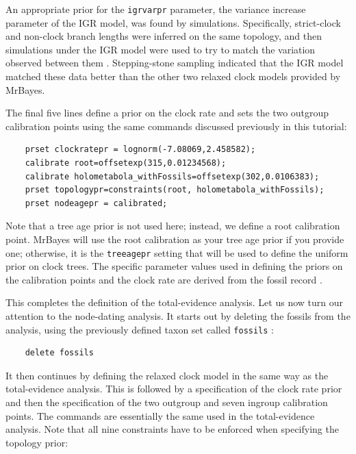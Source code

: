 \documentclass[12pt]{book}
\newcommand{\ttt}[1]{\texttt{#1} }
\begin{document}
An appropriate prior for the \ttt{igrvarpr} parameter, the variance increase parameter of the IGR model, was found
by simulations. Specifically, strict-clock and non-clock branch lengths were inferred on the same topology, and then
simulations under the IGR model were used to try to match the variation observed between them
\citep{ronquist12}. Stepping-stone sampling indicated that the IGR model matched these data better
than the other two relaxed clock models provided by MrBayes.

The final five lines define a prior on the clock rate and sets the two outgroup calibration points using the same
commands discussed previously in this tutorial:

\begin{singlespacing}
\begin{verbatim}
    prset clockratepr = lognorm(-7.08069,2.458582);
    calibrate root=offsetexp(315,0.01234568);
    calibrate holometabola_withFossils=offsetexp(302,0.0106383);
    prset topologypr=constraints(root, holometabola_withFossils);
    prset nodeagepr = calibrated;
\end{verbatim}
\end{singlespacing}

Note that a tree age prior is not used here; instead, we define a root calibration point. MrBayes will use the root
calibration as your tree age prior if you provide one; otherwise, it is the \ttt{treeagepr} setting that will be used to
define the uniform prior on clock trees. The specific parameter values used in defining the priors on the calibration
points and the clock rate are derived from the fossil record \citep{ronquist12}.

This completes the definition of the total-evidence analysis. Let us now turn our attention to the node-dating analysis.
It starts out by deleting the fossils from the analysis, using the previously defined taxon set called \ttt{fossils}:

\begin{verbatim}
    delete fossils
\end{verbatim}

It then continues by defining the relaxed clock model in the same way as the total-evidence analysis. This is followed
by a specification of the clock rate prior and then the specification of the two
outgroup and seven ingroup calibration points. The commands are essentially the same used in the total-evidence
analysis. Note that all nine constraints have to be enforced when specifying the topology prior:
\end{document}
